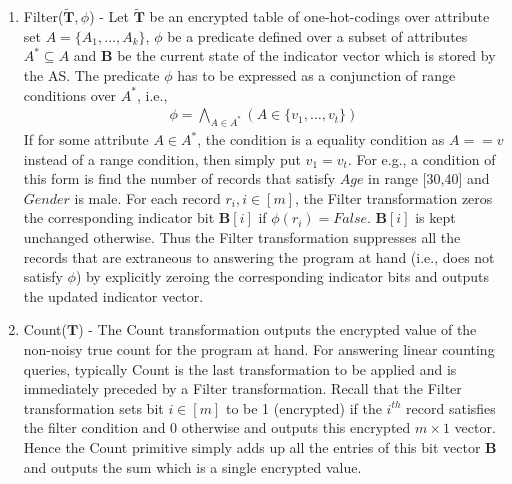 \begin{enumerate}
  \item \textsf{Filter}($\tilde{\mathbf{T}},\phi$) - Let $\tilde{\mathbf{T}}$ be an encrypted table of one-hot-codings over attribute set $A=\{A_1,...,A_k\}$, $\phi$ be a  predicate defined over a subset of attributes $A^*\subseteq A$ and $\mathbf{B}$ be the current state of the indicator vector which is stored by the \textsf{AS}. The predicate $\phi$ has to be expressed as a conjunction of range conditions over $A^*$, i.e.,\begin{gather}\phi = \bigwedge_{A \in A^*}(A \in \{v_{1},\ldots,v_{t}\} ) \label{phi} \end{gather} If for some attribute $A \in A^*$, the condition is a equality condition as $A==v$ instead of a range condition, then simply put $v_1=v_t$. For e.g., a condition of this form is find the number of records that satisfy $Age$ in range [30,40] and $Gender$ is male. For each record $r_i, i \in [m]$, the Filter transformation zeros the corresponding indicator bit $\mathbf{B}[i] $ if $\phi(r_i)=False$. $\mathbf{B}[i] $ is kept unchanged otherwise. Thus the \textsf{Filter} transformation suppresses all the records that are extraneous to answering the program at hand (i.e., does not satisfy $\phi$) by explicitly zeroing the corresponding indicator bits and outputs the updated indicator vector. %
    \item{\textsf{Count}($\mathbf{T}$) } - The \textsf{Count} transformation outputs the encrypted value of the non-noisy true count for the program at hand. For answering linear counting queries, typically \textsf{Count}  is the last transformation to be applied and is immediately preceded by a \textsf{Filter} transformation. Recall that the \textsf{Filter} transformation sets bit $i \in [m]$ to be 1 (encrypted) if the $i^{th}$ record satisfies the filter condition and 0 otherwise and outputs this encrypted $m\times 1$ vector. Hence the \textsf{Count} primitive simply adds up all the entries of this bit vector $\mathbf{B}$ and  outputs the sum which is a single encrypted value. 

\end{enumerate}
